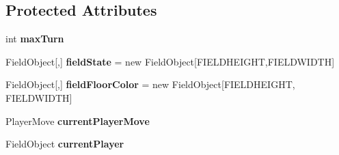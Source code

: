 \subsection*{Protected Attributes}
\begin{DoxyCompactItemize}
\item 
int {\bfseries max\+Turn}\hypertarget{classhoppin_1_1_game_system_1_1_game_state_ac0d86483ff1a4c0d1e3e7433ef6b7a47}{}\label{classhoppin_1_1_game_system_1_1_game_state_ac0d86483ff1a4c0d1e3e7433ef6b7a47}

\item 
Field\+Object\mbox{[},\mbox{]} {\bfseries field\+State} = new Field\+Object\mbox{[}F\+I\+E\+L\+D\+H\+E\+I\+G\+HT,F\+I\+E\+L\+D\+W\+I\+D\+TH\mbox{]}\hypertarget{classhoppin_1_1_game_system_1_1_game_state_a6001d9ae6220bae0ba0831799e3bf96d}{}\label{classhoppin_1_1_game_system_1_1_game_state_a6001d9ae6220bae0ba0831799e3bf96d}

\item 
Field\+Object\mbox{[},\mbox{]} {\bfseries field\+Floor\+Color} = new Field\+Object\mbox{[}F\+I\+E\+L\+D\+H\+E\+I\+G\+HT, F\+I\+E\+L\+D\+W\+I\+D\+TH\mbox{]}\hypertarget{classhoppin_1_1_game_system_1_1_game_state_a6b236f43815ef3fd89072d3b0ea11d33}{}\label{classhoppin_1_1_game_system_1_1_game_state_a6b236f43815ef3fd89072d3b0ea11d33}

\item 
Player\+Move {\bfseries current\+Player\+Move}\hypertarget{classhoppin_1_1_game_system_1_1_game_state_a34e4c930c267e3c1e8be2b33b1fb695b}{}\label{classhoppin_1_1_game_system_1_1_game_state_a34e4c930c267e3c1e8be2b33b1fb695b}

\item 
Field\+Object {\bfseries current\+Player}\hypertarget{classhoppin_1_1_game_system_1_1_game_state_a5057df7ffdb264f8835f209e1b882fc4}{}\label{classhoppin_1_1_game_system_1_1_game_state_a5057df7ffdb264f8835f209e1b882fc4}

\end{DoxyCompactItemize}
